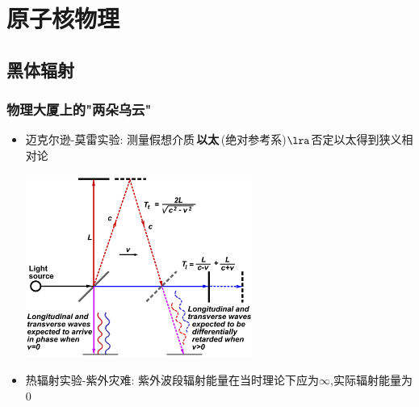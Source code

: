 \documentclass{article}
\begin{document}
\vspace{2em}

\section{原子核物理}
\subsection{黑体辐射}

\subsubsection{物理大厦上的"两朵乌云"}
\begin{itemize}
    \item 迈克尔逊-莫雷实验: 测量假想介质\,\textbf{以太}\,(绝对参考系)$\lra$否定以太得到狭义相对论

          \vspace{1em}

          \includegraphics[width=20em,keepaspectratio]{./pictures/4.png}

          \vspace{1em}

    \item 热辐射实验-紫外灾难: 紫外波段辐射能量在当时理论下应为$\infty$,实际辐射能量为$0$
\end{itemize}

\vspace{2em}
\end{document}
